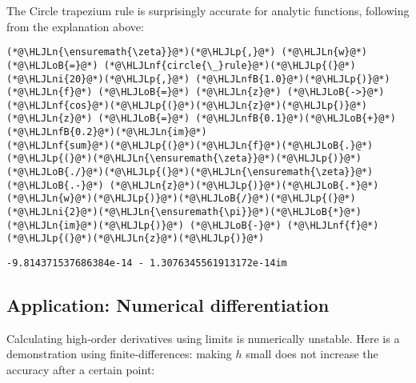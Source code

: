 \documentclass[12pt,landscape]{article}
\newcommand{\HLJLn}[1]{#1}
\newcommand{\HLJLnf}[1]{\textcolor[RGB]{66,102,213}{#1}}
\newcommand{\HLJLnfB}[1]{\textcolor[RGB]{59,151,46}{#1}}
\newcommand{\HLJLni}[1]{\textcolor[RGB]{59,151,46}{#1}}
\newcommand{\HLJLoB}[1]{\textcolor[RGB]{102,102,102}{\textbf{#1}}}
\newcommand{\HLJLp}[1]{#1}
\begin{document}
{The Circle trapezium rule is surprisingly accurate for analytic functions, following from the explanation above:


\begin{lstlisting}
(*@\HLJLn{\ensuremath{\zeta}}@*)(*@\HLJLp{,}@*) (*@\HLJLn{w}@*) (*@\HLJLoB{=}@*) (*@\HLJLnf{circle{\_}rule}@*)(*@\HLJLp{(}@*)(*@\HLJLni{20}@*)(*@\HLJLp{,}@*) (*@\HLJLnfB{1.0}@*)(*@\HLJLp{)}@*)
(*@\HLJLn{f}@*) (*@\HLJLoB{=}@*) (*@\HLJLn{z}@*) (*@\HLJLoB{->}@*) (*@\HLJLnf{cos}@*)(*@\HLJLp{(}@*)(*@\HLJLn{z}@*)(*@\HLJLp{)}@*)
(*@\HLJLn{z}@*) (*@\HLJLoB{=}@*) (*@\HLJLnfB{0.1}@*)(*@\HLJLoB{+}@*)(*@\HLJLnfB{0.2}@*)(*@\HLJLn{im}@*)
(*@\HLJLnf{sum}@*)(*@\HLJLp{(}@*)(*@\HLJLn{f}@*)(*@\HLJLoB{.}@*)(*@\HLJLp{(}@*)(*@\HLJLn{\ensuremath{\zeta}}@*)(*@\HLJLp{)}@*)(*@\HLJLoB{./}@*)(*@\HLJLp{(}@*)(*@\HLJLn{\ensuremath{\zeta}}@*) (*@\HLJLoB{.-}@*) (*@\HLJLn{z}@*)(*@\HLJLp{)}@*)(*@\HLJLoB{.*}@*)(*@\HLJLn{w}@*)(*@\HLJLp{)}@*)(*@\HLJLoB{/}@*)(*@\HLJLp{(}@*)(*@\HLJLni{2}@*)(*@\HLJLn{\ensuremath{\pi}}@*)(*@\HLJLoB{*}@*)(*@\HLJLn{im}@*)(*@\HLJLp{)}@*) (*@\HLJLoB{-}@*) (*@\HLJLnf{f}@*)(*@\HLJLp{(}@*)(*@\HLJLn{z}@*)(*@\HLJLp{)}@*)
\end{lstlisting}

\begin{lstlisting}
-9.814371537686384e-14 - 1.3076345561913172e-14im
\end{lstlisting}

\newpage
\subsection{Application: Numerical differentiation}
Calculating high-order derivatives using limits is numerically unstable. Here is a demonstration using finite-differences: making $h$ small does not increase the accuracy after a certain point:


}
\end{document}
